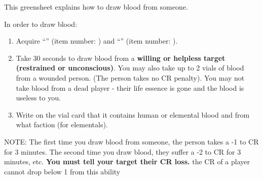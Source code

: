 \documentclass[green]{elementals}
\begin{document}
\name{\gDrawBlood{}} 

This greensheet explains how to draw blood from someone.

In order to draw blood:
\begin{enumerate}
\item Acquire ``\iVial{}'' (item number: \iVial{\MYnumber{}}) and ``\iSyringe{}'' (item number: \iSyringe{\MYnumber{}}). 
\item Take 30 seconds to draw blood from a {\bf willing or helpless target (restrained or unconscious)}. You may also take up to 2 vials of blood from a wounded person. (The person takes no CR penalty). You may not take blood from a dead player - their life essence is gone and the blood is useless to you.
\item Write on the vial card that it contains human or elemental blood and from what faction (for elementals). 
\end{enumerate}

NOTE: The first time you draw blood from someone, the person takes a -1 to CR for 3 minutes. The second time you draw blood, they suffer a -2 to CR for 3 minutes, etc. {\bf You must tell your target their CR loss.} the CR of a player cannot drop below 1 from this ability
\end{document}
